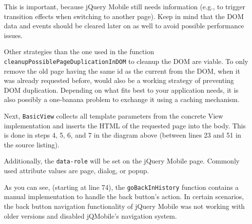 \documentclass[9pt]{book}
\begin{document}
This is important, because jQuery Mobile still needs information (e.g.,
to trigger transition effects when switching to another page). Keep in
mind that the DOM data and events should be cleared later on as well to
avoid possible performance issues.

Other strategies than the one used in the function
\texttt{cleanupPossiblePageDuplicationInDOM} to cleanup the DOM are
viable. To only remove the old page having the same id as the current
from the DOM, when it was already requested before, would also be a
working strategy of preventing DOM duplication. Depending on what fits
best to your application needs, it is also possibly a one-banana problem
to exchange it using a caching mechanism.

Next, \texttt{BasicView} collects all template parameters from the
concrete View implementation and inserts the HTML of the requested page
into the body. This is done in steps 4, 5, 6, and 7 in the diagram above
(between lines 23 and 51 in the source listing).

Additionally, the \texttt{data-role} will be set on the jQuery Mobile
page. Commonly used attribute values are page, dialog, or popup.

As you can see, (starting at line 74), the \texttt{goBackInHistory}
function contains a manual implementation to handle the back button's
action. In certain scenarios, the back button navigation functionality
of jQuery Mobile was not working with older versions and disabled
jQMobile's navigation system.
\end{document}
